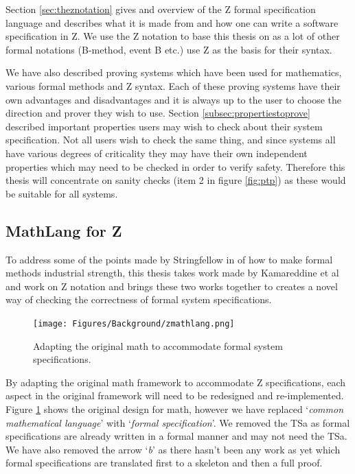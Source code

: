 Section \ref{sec:theznotation} gives and overview of the Z formal specification
language and describes what it is made from and how one can write a software
specification in Z. We use the Z notation to base this thesis on as a lot of
other formal notations (B-method, event B etc.) use Z as the basis for their
syntax.

We have also described proving systems which have been used for mathematics,
various formal methods and Z syntax. Each of these proving systems have their
own advantages and disadvantages and it is always up to the user to choose the
direction and prover they wish to use. Section \ref{subsec:propertiestoprove}
described important properties users may wish to check about their system
specification. Not all users wish to check the same thing, and since  systems
all have various degrees of criticality they may have their own independent
properties which may need to be checked in order to verify safety. Therefore
this thesis will concentrate on sanity checks (item 2 in figure \ref{fig:ptp})
as these would be suitable for all systems.

\subsection{MathLang for Z}

To address some of the points made by Stringfellow in \cite{fmpresetation} of
how to make formal methods industrial strength, this thesis takes work made by
Kamareddine et al \cite{newmathlang} and work on Z notation
\cite{spiveyreferencemanual} and brings these two works together to creates a
novel way of checking the correctness of formal system specifications.

\begin{figure}[H]
\begin{center}
\texttt{[image: Figures/Background/zmathlang.png]}
\end{center}
\caption{Adapting the original \gls{math} to accommodate formal system specifications. \label{fig:zmathlang}}
\end{figure}

By adapting the original \gls{math} framework to accommodate Z specifications,
each aspect in the original framework will need to be redesigned and
re-implemented. Figure \ref{fig:zmathlang} shows the original design for
\gls{math}, however we have replaced `\emph{common mathematical language}' with
`\emph{formal specification}'. We removed the TSa as formal specifications are
already written in a formal manner and may not need the TSa. We have also
removed the arrow `\emph{b}' as there hasn't been any work as yet which formal
specifications are translated first to a skeleton and then a full proof.

